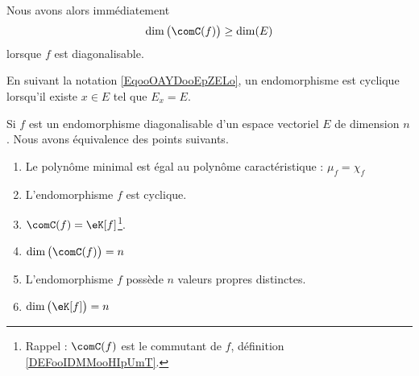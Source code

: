 \begin{remark}      \label{REMooUGFQooVzCOvV}
	Nous avons alors immédiatement
	\begin{equation}
		\dim\big( \comC(f) \big)\geq\dim(E)
	\end{equation}
	lorsque \( f\) est diagonalisable.
\end{remark}

En suivant la notation \eqref{EqooOAYDooEpZELo}, un endomorphisme est cyclique lorsqu'il existe \( x\in E\) tel que \( E_x=E\).

\begin{proposition}      \label{PropooQALUooTluDif}
	Si \( f\) est un endomorphisme diagonalisable d'un espace vectoriel \( E\) de dimension \( n\). Nous avons équivalence des points suivants.
	\begin{enumerate}
		\item\label{ITEMooSOYYooZVibjrii}
		Le polynôme minimal est égal au polynôme caractéristique : \( \mu_f=\chi_f\)
		\item\label{ITEMooSOYYooZVibjrvi}
		L'endomorphisme \( f\) est cyclique.
		\item\label{ITEMooSOYYooZVibjrv}
		\( \comC(f)=\eK[f]\)\footnote{Rappel : \( \comC(f)\) est le commutant de \( f\), définition \ref{DEFooIDMMooHIpUmT}.}.
		\item\label{ITEMooSOYYooZVibjriv}
		\( \dim\big( \comC(f) \big)=n\)
		\item\label{ITEMooSOYYooZVibjriii}
		L'endomorphisme \( f\) possède \( n\) valeurs propres distinctes.
		\item   \label{ITEMooSOYYooZVibjri}
		      \( \dim\big( \eK[f] \big)=n\)
	\end{enumerate}
\end{proposition}

